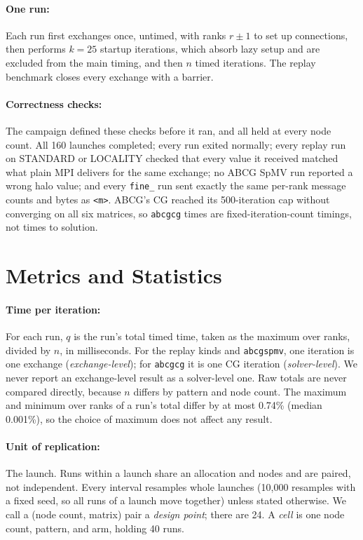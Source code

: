 \documentclass[11pt]{article}
\newcommand{\kM}{\texttt{<m>}}
\newcommand{\kF}{\texttt{fine\_}}
\newcommand{\spmv}{\texttt{abcgspmv}}
\newcommand{\cg}{\texttt{abcgcg}}
\begin{document}
\paragraph{One run:} Each run first exchanges once, untimed, with ranks $r\pm1$ to set up
connections, then performs $k=25$ startup iterations, which absorb lazy setup and are
excluded from the main timing, and then $n$ timed iterations. The replay benchmark closes
every exchange with a barrier.

\paragraph{Correctness checks:} The campaign defined these checks before it ran, and all
held at every node count. All 160 launches completed; every run exited normally; every
replay run on STANDARD or LOCALITY checked that every value it received matched what plain
MPI delivers for the same exchange; no ABCG SpMV run reported a wrong halo value; and every \kF{} run sent
exactly the same per-rank message counts and bytes as \kM. ABCG's CG reached its
500-iteration cap without converging on all six matrices, so \cg{} times are
fixed-iteration-count timings, not times to solution.

\section{Metrics and Statistics}
\label{sec:methods}

\paragraph{Time per iteration:} For each run, $q$ is the run's total timed time, taken as
the maximum over ranks, divided by $n$, in milliseconds. For the replay kinds and \spmv,
one iteration is one exchange (\emph{exchange-level}); for \cg{} it is one CG iteration
(\emph{solver-level}). We never report an exchange-level result as a solver-level one. Raw
totals are never compared directly, because $n$ differs by pattern and node count. The
maximum and minimum over ranks of a run's total differ by at most 0.74\% (median
0.001\%), so the choice of maximum does not affect any result.

\paragraph{Unit of replication:} The launch. Runs within a launch share an allocation and
nodes and are paired, not independent. Every interval resamples whole launches (10,000
resamples with a fixed seed, so all runs of a launch move together) unless stated
otherwise. We call a (node count, matrix) pair a \emph{design point}; there are 24. A
\emph{cell} is one node count, pattern, and arm, holding 40 runs.
\end{document}

